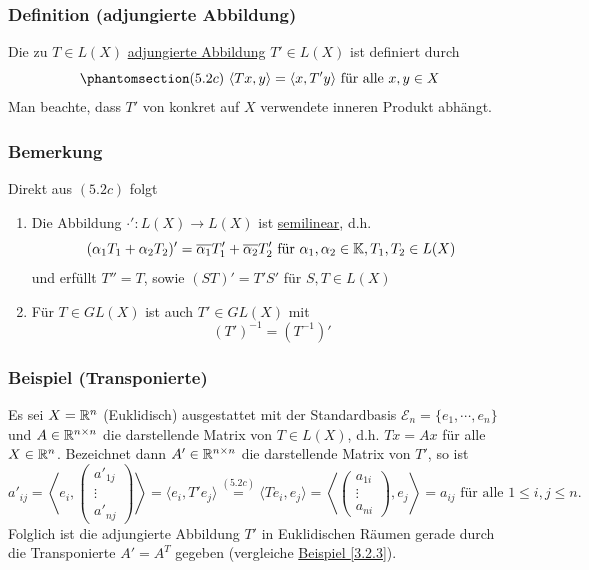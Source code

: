 \subsubsection{Definition (adjungierte Abbildung)}
Die zu $T\in L(X)$ \underline{adjungierte Abbildung} $T'\in L(X)$ ist definiert durch
\[\phantomsection\label{5.2c}(5.2c)\ \langle Tx,y\rangle = \langle x,T'y\rangle \text{ für alle } x,y\in X\]
Man beachte, dass $T'$ von konkret auf $X$ verwendete inneren Produkt abhängt.
\subsubsection{Bemerkung}
Direkt aus \hyperref[5.2c]{$(5.2c)$} folgt
\numbers
\begin{enumerate}
\item Die Abbildung $\cdot '\colon L(X)\rightarrow L(X)$ ist \underline{semilinear}, d.h.
\[(\alpha _1T_1+\alpha _2T_2)'=\overline{\alpha _1}T'_1+\overline{\alpha _2}T'_2\text{ für }\alpha _1,\alpha _2\in \mathbb{K}, T_1,T_2\in L(X)\]
und erfüllt $T''=T$, sowie $(ST)'=T'S'$ für $S,T\in L(X)$
\item Für $T\in GL(X)$ ist auch $T'\in GL(X)$ mit
\[(T')^{-1}=(T^{-1})'\]
\end{enumerate}
\subsubsection{Beispiel (Transponierte)}
Es sei $X=\mathbb{R} ^n$ (Euklidisch) ausgestattet mit der Standardbasis $\mathcal{E}_n=\{e_1,\cdots ,e_n\}$ und $A\in \mathbb{R} ^{n\times n}$ die darstellende Matrix von $T\in L(X)$, d.h. $Tx=Ax$ für alle $X\in \mathbb{R} ^n$.  Bezeichnet dann $A'\in \mathbb{R} ^{n\times n}$ die darstellende Matrix von $T'$, so ist
\[a'_{ij}=\left\langle e_i,\begin{pmatrix}a'_{1j}\\ \vdots \\ a'_{nj}\end{pmatrix}\right\rangle = \langle e_i,T'e_j\rangle\stackrel{\hyperref[5.2c]{(5.2c)}}{=}\langle Te_i,e_j\rangle =\left\langle \begin{pmatrix}a_{1i}\\ \vdots \\ a_{ni}\end{pmatrix},e_j\right\rangle = a_{ij} \text{ für alle }1\leq i,j\leq n.\]
Folglich ist die adjungierte Abbildung $T'$ in Euklidischen Räumen gerade durch die Transponierte $A'=A^T$ gegeben (vergleiche \hyperref[3.2.3]{Beispiel \ref{3.2.3}}).
